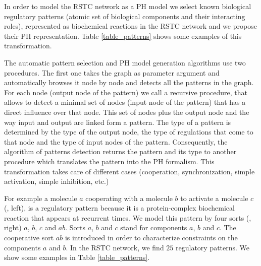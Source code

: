 In order to model the RSTC network as a PH model we select known biological regulatory patterns (atomic set of biological components and their interacting roles), represented 
as biochemical reactions in the RSTC network and we propose their PH representation. Table \ref{table_patterns} shows some examples of this transformation. 

The automatic pattern selection and PH model generation algorithms use two procedures. 
%
The first one takes the graph as parameter argument and automatically browses it node by node and detects all the patterns in the graph. 
For each node (output node of the pattern) we  call a recursive procedure,
that  allows  to detect a minimal set of nodes (input node of the pattern) that has a direct influence over that node. 
This set of nodes plus the output node and the way  input and output are linked form a pattern. 
The type of a pattern is determined by the type of the output node, the type of regulations that come to that node and the type of input nodes of the pattern. 
Consequently, the algorithm of patterns detection returns the pattern 
and its type to another procedure  which  translates the pattern into the PH formalism. This transformation  takes care of different cases (cooperation, synchronization, simple activation, simple inhibition, etc.)


For example a molecule $a$ cooperating with a molecule $b$ to activate a molecule $c$ (, left), is a regulatory pattern because it is a protein-complex biochemical reaction that appears at recurrent times.  
We model this pattern by four sorts (, right) $a$, $b$, $c$ and $ab$. Sorts $a$, $b$ and $c$
stand for components $a$, $b$ and $c$. The cooperative sort $ab$ is introduced in order to characterize constraints on the components $a$ and $b$.
In the RSTC network, we find  $25$ regulatory patterns. We show some examples in Table \ref{table_patterns}.     %

